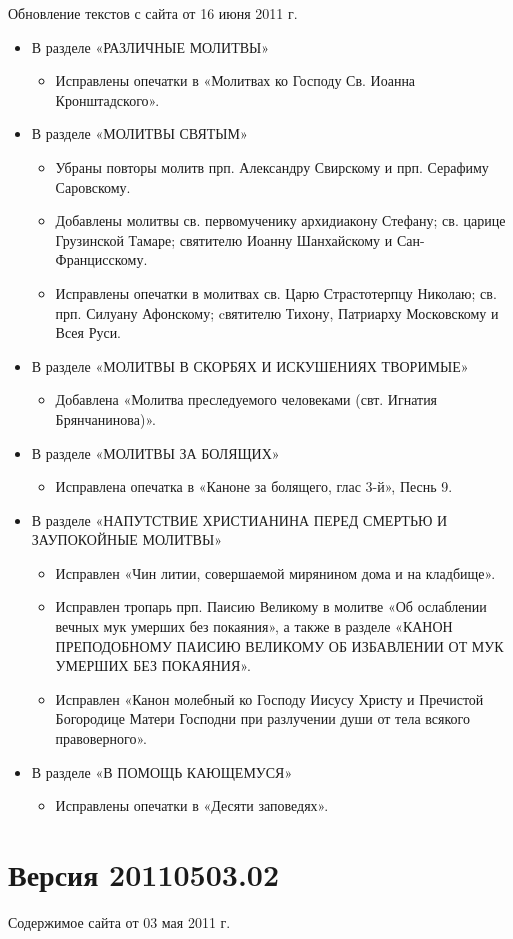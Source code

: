Обновление текстов с сайта от 16 июня 2011 г.
\begin{itemize}

\item В разделе «РАЗЛИЧНЫЕ МОЛИТВЫ»
\begin{itemize}
\item Исправлены опечатки в «Молитвах ко Господу Св. Иоанна Кронштадского».
\end{itemize}

\item В разделе «МОЛИТВЫ СВЯТЫМ»
\begin{itemize}
\item Убраны повторы молитв прп. Александру Свирскому и прп. Серафиму Саровскому.
\item Добавлены молитвы св. первомученику архидиакону Стефану; св. царице Грузинской Тамаре; святителю Иоанну Шанхайскому и Сан-Францисскому.
\item Исправлены опечатки в молитвах св. Царю Страстотерпцу Николаю; св. прп. Силуану Афонскому; cвятителю Тихону, Патриарху Московскому и Всея Руси.
\end{itemize}

\item В разделе «МОЛИТВЫ В СКОРБЯХ И ИСКУШЕНИЯХ ТВОРИМЫЕ»
\begin{itemize}
\item Добавлена «Молитва преследуемого человеками (свт. Игнатия Брянчанинова)».
\end{itemize}

\item В разделе «МОЛИТВЫ ЗА БОЛЯЩИХ»
\begin{itemize}
\item Исправлена опечатка в «Каноне за болящего, глас 3-й», Песнь 9.
\end{itemize}

\item В разделе «НАПУТСТВИЕ ХРИСТИАНИНА ПЕРЕД СМЕРТЬЮ И ЗАУПОКОЙНЫЕ МОЛИТВЫ»
\begin{itemize}
\item Исправлен «Чин литии, совершаемой мирянином дома и на кладбище».
\item Исправлен тропарь прп. Паисию Великому в молитве «Об ослаблении вечных мук умерших без покаяния», а также в разделе «КАНОН ПРЕПОДОБНОМУ ПАИСИЮ ВЕЛИКОМУ ОБ ИЗБАВЛЕНИИ ОТ МУК УМЕРШИХ БЕЗ ПОКАЯНИЯ».
\item Исправлен «Канон молебный ко Господу Иисусу Христу и Пречистой Богородице Матери Господни при разлучении души от тела всякого правоверного».
\end{itemize}

\item В разделе «В ПОМОЩЬ КАЮЩЕМУСЯ»
\begin{itemize}
\item Исправлены опечатки в «Десяти заповедях».
\end{itemize}


\end{itemize}


\section*{Версия 20110503.02}
Содержимое сайта от 03 мая 2011 г.

\mychapterending

